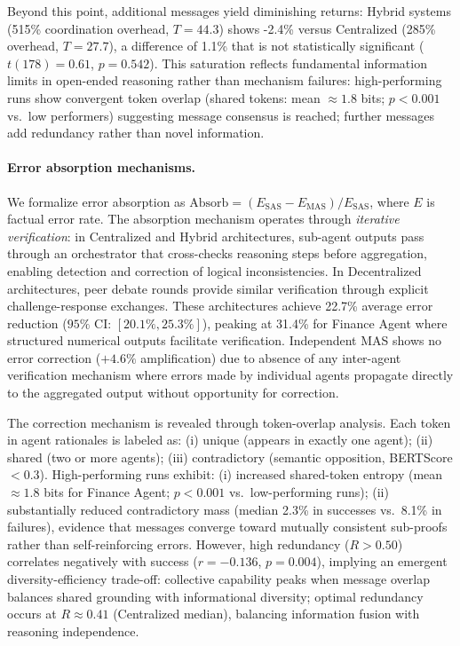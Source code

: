 Beyond this point, additional messages yield diminishing returns: Hybrid systems (515\% coordination overhead, $T=44.3$) shows -2.4\%  versus Centralized (285\% overhead, $T=27.7$), a difference of 1.1\%  that is not statistically significant ($t(178)=0.61$, $p=0.542$). This saturation reflects fundamental information limits in open-ended reasoning rather than mechanism failures: high-performing runs show convergent token overlap (shared tokens: mean $\approx 1.8$ bits; $p<0.001$ vs.\ low performers) suggesting message consensus is reached; further messages add redundancy rather than novel information.
  
  \paragraph{Error absorption mechanisms.}
  We formalize error absorption as $\text{Absorb} = (E_{\text{SAS}} - E_{\text{MAS}})/E_{\text{SAS}}$, where $E$ is factual error rate. The absorption mechanism operates through \emph{iterative verification}: in Centralized and Hybrid architectures, sub-agent outputs pass through an orchestrator that cross-checks reasoning steps before aggregation, enabling detection and correction of logical inconsistencies. In Decentralized architectures, peer debate rounds provide similar verification through explicit challenge-response exchanges. These architectures achieve 22.7\% average error reduction ($95\%$ CI: $[20.1\%, 25.3\%]$), peaking at 31.4\% for Finance Agent where structured numerical outputs facilitate verification. Independent MAS shows no error correction ($+4.6\%$ amplification) due to absence of any inter-agent verification mechanism where errors made by individual agents propagate directly to the aggregated output without opportunity for correction.
  
  The correction mechanism is revealed through token-overlap analysis. Each token in agent rationales is labeled as: (i) unique (appears in exactly one agent); (ii) shared (two or more agents); (iii) contradictory (semantic opposition, BERTScore $< 0.3$). High-performing runs exhibit: (i) increased shared-token entropy (mean $\approx 1.8$ bits for Finance Agent; $p<0.001$ vs.\ low-performing runs); (ii) substantially reduced contradictory mass (median 2.3\% in successes vs.\ 8.1\% in failures), evidence that messages converge toward mutually consistent sub-proofs rather than self-reinforcing errors. However, high redundancy ($R > 0.50$) correlates negatively with success ($r = -0.136$, $p = 0.004$), implying an emergent diversity-efficiency trade-off: collective capability peaks when message overlap balances shared grounding with informational diversity; optimal redundancy occurs at $R \approx 0.41$ (Centralized median), balancing information fusion with reasoning independence.



